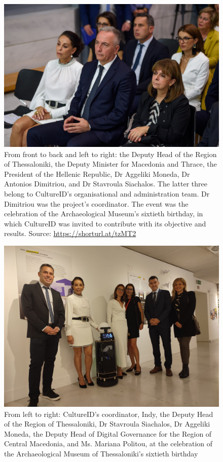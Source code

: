 \begin{figure}[H]\centering
  \includegraphics[scale=0.35]{images/cultureid/omg1.jpg}
  \caption{\small From front to back and left to right: the Deputy Head of the
           Region of Thessaloniki, the Deputy Minister for Macedonia and Thrace,
           the President of the Hellenic Republic, Dr Aggeliki Moneda, Dr
           Antonios Dimitriou, and Dr Stavroula Siachalos. The latter three
           belong to CultureID's organisational and administration team.
           Dr Dimitriou was the project's coordinator. The event was the
           celebration of the Archaeological Museum's sixtieth birthday, in
           which CultureID was invited to contribute with its objective and
           results.  Source: \url{https://shorturl.at/tzMT2}}
  \label{fig:cultureid_omg1}
\end{figure}
\begin{figure}[H]\centering
  \includegraphics[scale=0.2]{images/cultureid/omg2.jpg}
  \caption{\small From left to right: CultureID's coordinator, Indy, the Deputy
           Head of the Region of Thessaloniki, Dr Stavroula Siachalos, Dr
           Aggeliki Moneda, the Deputy Head of Digital Governance for the
           Region of Central Macedonia, and Ms. Mariana Politou, at the
           celebration of the Archaeological Museum of Thessaloniki's sixtieth
           birthday}
  \label{fig:cultureid_omg2}
\end{figure}
